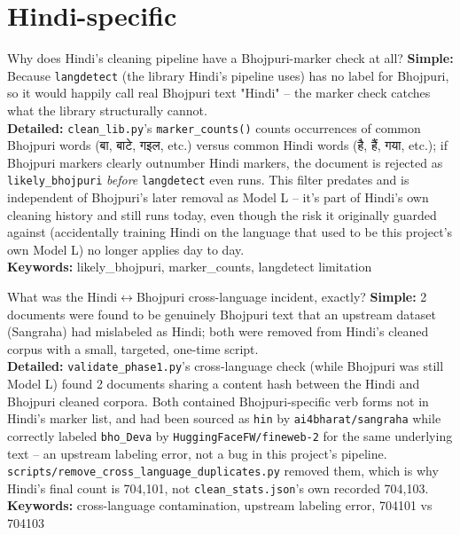 \documentclass[11pt]{report}
\newcommand{\dn}[1]{{\devanagarifont #1}}
\begin{document}
\section{Hindi-specific}

\begin{qabox}{Why does Hindi's cleaning pipeline have a Bhojpuri-marker
check at all?}
\textbf{Simple:} Because \texttt{langdetect} (the library Hindi's
pipeline uses) has no label for Bhojpuri, so it would happily call real
Bhojpuri text "Hindi" -- the marker check catches what the library
structurally cannot.\\
\textbf{Detailed:} \texttt{clean\_lib.py}'s \texttt{marker\_counts()}
counts occurrences of common Bhojpuri words (\dn{बा}, \dn{बाटे},
\dn{गइल}, etc.) versus common Hindi words (\dn{है}, \dn{हैं}, \dn{गया},
etc.); if Bhojpuri markers clearly outnumber Hindi markers, the document
is rejected as \texttt{likely\_bhojpuri} \textit{before}
\texttt{langdetect} even runs. This filter predates and is independent
of Bhojpuri's later removal as Model L -- it's part of Hindi's own
cleaning history and still runs today, even though the risk it originally
guarded against (accidentally training Hindi on the language that used to
be this project's own Model L) no longer applies day to day.\\
\textbf{Keywords:} likely\_bhojpuri, marker\_counts, langdetect limitation
\end{qabox}

\begin{qabox}{What was the Hindi$\leftrightarrow$Bhojpuri cross-language
incident, exactly?}
\textbf{Simple:} 2 documents were found to be genuinely Bhojpuri text
that an upstream dataset (Sangraha) had mislabeled as Hindi; both were
removed from Hindi's cleaned corpus with a small, targeted, one-time
script.\\
\textbf{Detailed:} \texttt{validate\_phase1.py}'s cross-language check
(while Bhojpuri was still Model L) found 2 documents sharing a content
hash between the Hindi and Bhojpuri cleaned corpora. Both contained
Bhojpuri-specific verb forms not in Hindi's marker list, and had been
sourced as \texttt{hin} by \texttt{ai4bharat/sangraha} while correctly
labeled \texttt{bho\_Deva} by \texttt{HuggingFaceFW/fineweb-2} for the
same underlying text -- an upstream labeling error, not a bug in this
project's pipeline. \texttt{scripts/remove\_cross\_language\_duplicates.py}
removed them, which is why Hindi's final count is 704,101, not
\texttt{clean\_stats.json}'s own recorded 704,103.\\
\textbf{Keywords:} cross-language contamination, upstream labeling error,
704101 vs 704103
\end{qabox}
\end{document}

